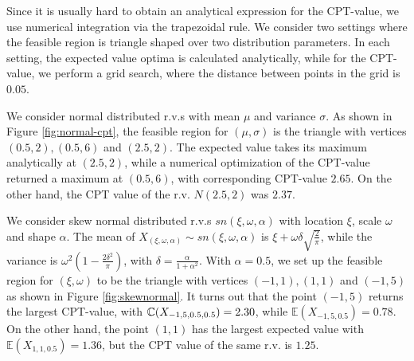 Since it is usually hard to obtain an analytical expression for the CPT-value, we use numerical integration via the trapezoidal rule. 
We consider two settings where the feasible region is triangle shaped over two distribution parameters. In each setting, the expected value optima is calculated analytically, while for the CPT-value, we perform a grid search, where the distance between points in the grid is $0.05$. 
\begin{example}
We consider normal distributed r.v.s with mean $\mu$ and variance $\sigma$. As shown in Figure \ref{fig:normal-cpt}, the feasible region for $(\mu, \sigma)$ is the triangle with vertices $(0.5,2), (0.5,6)$ and $(2.5,2)$. The expected value takes its maximum analytically at $(2.5, 2)$, while a numerical optimization of the CPT-value returned a maximum at $(0.5, 6)$, with corresponding CPT-value $2.65$. On the other hand, the CPT value of the r.v. $N(2.5, 2)$ was $2.37$.
\end{example}

\begin{example}
We consider skew normal distributed r.v.s $sn(\xi, \omega, \alpha)$ with location $\xi$, scale $\omega$ and shape $\alpha$.  
The mean of $X_{(\xi, \omega, \alpha)} \sim sn(\xi, \omega, \alpha)$ is 
$\xi + \omega \delta \sqrt{\frac{2}{\pi}}$, while the  variance is
$\omega^2(1 - \frac{2\delta^2}{\pi})$, with $\delta = \frac{\alpha}{1 + \alpha^2}$.
With $\alpha=0.5$, we set up the feasible region for $(\xi, \omega)$ to be the triangle with vertices $(-1,1), (1,1)$ and $(-1,5)$ as shown in Figure \ref{fig:skewnormal}.  
It turns out that the point $(-1,5)$ returns the largest CPT-value, with $\mathbb{C}(X_{-1,5,0.5,0.5}) = 2.30$, while
$\mathbb{E}(X_{-1,5,0.5}) = 0.78$.
On the other hand, the point $(1,1)$ has the largest expected value with $\mathbb{E}(X_{1,1,0.5}) = 1.36$, but the CPT value of the same r.v. is $1.25$.
\end{example}


